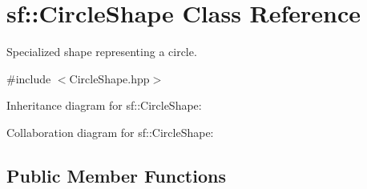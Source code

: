 \hypertarget{classsf_1_1_circle_shape}{}\section{sf\+:\+:Circle\+Shape Class Reference}
\label{classsf_1_1_circle_shape}


Specialized shape representing a circle.  




{\ttfamily \#include $<$Circle\+Shape.\+hpp$>$}



Inheritance diagram for sf\+:\+:Circle\+Shape\+:


Collaboration diagram for sf\+:\+:Circle\+Shape\+:
\subsection*{Public Member Functions}
